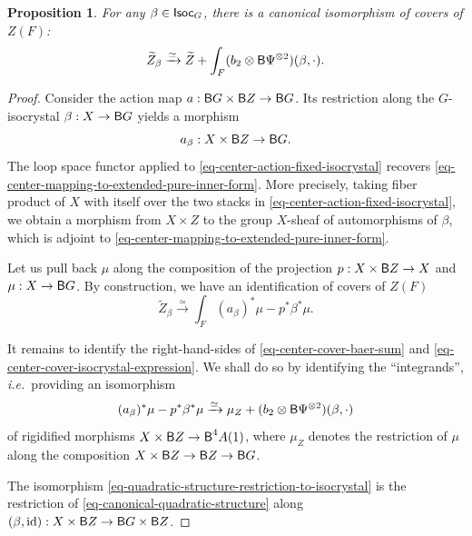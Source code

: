 \documentclass[10pt,english,reqno]{amsart}
\newcommand{\Isoc}{\textnormal{\textsf{Isoc}}}
\newcommand{\id}{\mathrm{id}}
\newcommand{\deloop}{\textnormal{\textsf{B}}}
\newtheorem{prop}[subsubsection]{Proposition}
\theoremstyle{definition}
\numberwithin{equation}{section}
\begin{document}

\begin{prop}
\label{prop-isocrystal-center-cover}
For any $\beta \in \Isoc_G$, there is a canonical isomorphism of covers of $Z(F)$:
\begin{equation}
\label{eq-center-cover-baer-sum}
\widetilde Z_{\beta} \xrightarrow{\simeq} \widetilde Z + \int_F (b_2\otimes \deloop\Psi^{\otimes 2})(\beta, \cdot).
\end{equation}
\end{prop}
\begin{proof}
Consider the action map $a : \deloop G \times \deloop Z \rightarrow \deloop G$. Its restriction along the $G$-isocrystal $\beta : X \rightarrow \deloop G$ yields a morphism
\begin{equation}
\label{eq-center-action-fixed-isocrystal}
a_{\beta} : X\times \deloop Z \rightarrow \deloop G.
\end{equation}
The loop space functor applied to \eqref{eq-center-action-fixed-isocrystal} recovers \eqref{eq-center-mapping-to-extended-pure-inner-form}. More precisely, taking fiber product of $X$ with itself over the two stacks in \eqref{eq-center-action-fixed-isocrystal}, we obtain a morphism from $X\times Z$ to the group $X$-sheaf of automorphisms of $\beta$, which is adjoint to \eqref{eq-center-mapping-to-extended-pure-inner-form}.

Let us pull back $\mu$ along the composition of the projection $p : X\times \deloop Z \rightarrow X$ and $\mu : X \rightarrow \deloop G$. By construction, we have an identification of covers of $Z(F)$
\begin{equation}
\label{eq-center-cover-isocrystal-expression}
\widetilde Z_{\beta} \xrightarrow{\simeq} \int_F (a_{\beta})^*\mu - p^*\beta^*\mu.
\end{equation}

It remains to identify the right-hand-sides of \eqref{eq-center-cover-baer-sum} and \eqref{eq-center-cover-isocrystal-expression}. We shall do so by identifying the ``integrands'', \emph{i.e.}~providing an isomorphism
\begin{equation}
\label{eq-quadratic-structure-restriction-to-isocrystal}
(a_{\beta})^*\mu - p^*\beta^*\mu \xrightarrow{\simeq} \mu_Z + (b_2\otimes \deloop\Psi^{\otimes 2})(\beta, \cdot)
\end{equation}
of rigidified morphisms $X\times \deloop Z \rightarrow \deloop^4A(1)$, where $\mu_Z$ denotes the restriction of $\mu$ along the composition $X\times\deloop Z \rightarrow \deloop Z \rightarrow \deloop G$.

The isomorphism \eqref{eq-quadratic-structure-restriction-to-isocrystal} is the restriction of \eqref{eq-canonical-quadratic-structure} along $(\beta, \id) : X\times \deloop Z \rightarrow \deloop G \times\deloop Z$.
\end{proof}
\end{document}
